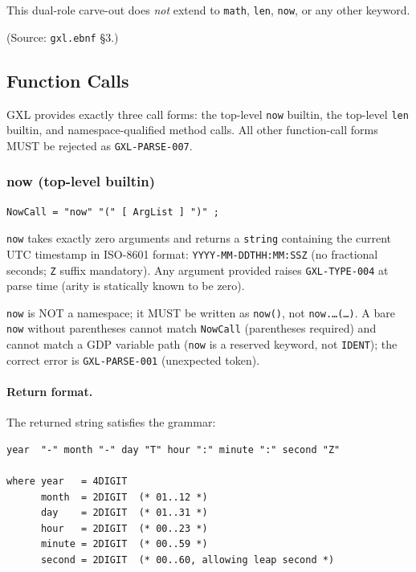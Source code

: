 This dual-role carve-out does \emph{not} extend to \texttt{math},
\texttt{len}, \texttt{now}, or any other keyword.

(Source: \texttt{gxl.ebnf} \S3.)

\subsection{Function Calls}
\label{subsec:gxl:calls}

GXL provides exactly three call forms:
the top-level \texttt{now} builtin, the top-level \texttt{len} builtin,
and namespace-qualified method calls.
All other function-call forms MUST be rejected as \texttt{GXL-PARSE-007}.

\subsubsection{now (top-level builtin)}
\label{subsubsec:gxl:now-call}

\begin{verbatim}
NowCall = "now" "(" [ ArgList ] ")" ;
\end{verbatim}

\texttt{now} takes exactly zero arguments and returns a \texttt{string}
containing the current UTC timestamp in ISO-8601 format:
\texttt{YYYY-MM-DDTHH:MM:SSZ} (no fractional seconds; \texttt{Z} suffix
mandatory).  Any argument provided raises \texttt{GXL-TYPE-004} at parse
time (arity is statically known to be zero).

\texttt{now} is NOT a namespace; it MUST be written as \texttt{now()},
not \texttt{now.\ldots(\ldots)}.  A bare \texttt{now} without parentheses
cannot match \texttt{NowCall} (parentheses required) and cannot match a GDP
variable path (\texttt{now} is a reserved keyword, not \texttt{IDENT}); the
correct error is \texttt{GXL-PARSE-001} (unexpected token).

\paragraph{Return format.}
The returned string satisfies the grammar:

\begin{verbatim}
year  "-" month "-" day "T" hour ":" minute ":" second "Z"

where year   = 4DIGIT
      month  = 2DIGIT  (* 01..12 *)
      day    = 2DIGIT  (* 01..31 *)
      hour   = 2DIGIT  (* 00..23 *)
      minute = 2DIGIT  (* 00..59 *)
      second = 2DIGIT  (* 00..60, allowing leap second *)
\end{verbatim}

